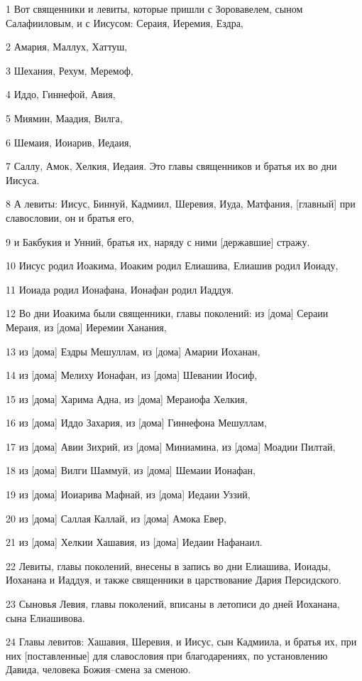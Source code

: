 \par 1 Вот священники и левиты, которые пришли с Зоровавелем, сыном Салафииловым, и с Иисусом: Сераия, Иеремия, Ездра,
\par 2 Амария, Маллух, Хаттуш,
\par 3 Шехания, Рехум, Меремоф,
\par 4 Иддо, Гиннефой, Авия,
\par 5 Миямин, Маадия, Вилга,
\par 6 Шемаия, Иоиарив, Иедаия,
\par 7 Саллу, Амок, Хелкия, Иедаия. Это главы священников и братья их во дни Иисуса.
\par 8 А левиты: Иисус, Биннуй, Кадмиил, Шеревия, Иуда, Матфания, [главный] при славословии, он и братья его,
\par 9 и Бакбукия и Унний, братья их, наряду с ними [державшие] стражу.
\par 10 Иисус родил Иоакима, Иоаким родил Елиашива, Елиашив родил Иоиаду,
\par 11 Иоиада родил Ионафана, Ионафан родил Иаддуя.
\par 12 Во дни Иоакима были священники, главы поколений: из [дома] Сераии Мераия, из [дома] Иеремии Ханания,
\par 13 из [дома] Ездры Мешуллам, из [дома] Амарии Иоханан,
\par 14 из [дома] Мелиху Ионафан, из [дома] Шевании Иосиф,
\par 15 из [дома] Харима Адна, из [дома] Мераиофа Хелкия,
\par 16 из [дома] Иддо Захария, из [дома] Гиннефона Мешуллам,
\par 17 из [дома] Авии Зихрий, из [дома] Миниамина, из [дома] Моадии Пилтай,
\par 18 из [дома] Вилги Шаммуй, из [дома] Шемаии Ионафан,
\par 19 из [дома] Иоиарива Мафнай, из [дома] Иедаии Уззий,
\par 20 из [дома] Саллая Каллай, из [дома] Амока Евер,
\par 21 из [дома] Хелкии Хашавия, из [дома] Иедаии Нафанаил.
\par 22 Левиты, главы поколений, внесены в запись во дни Елиашива, Иоиады, Иоханана и Иаддуя, и также священники в царствование Дария Персидского.
\par 23 Сыновья Левия, главы поколений, вписаны в летописи до дней Иоханана, сына Елиашивова.
\par 24 Главы левитов: Хашавия, Шеревия, и Иисус, сын Кадмиила, и братья их, при них [поставленные] для славословия при благодарениях, по установлению Давида, человека Божия--смена за сменою.
